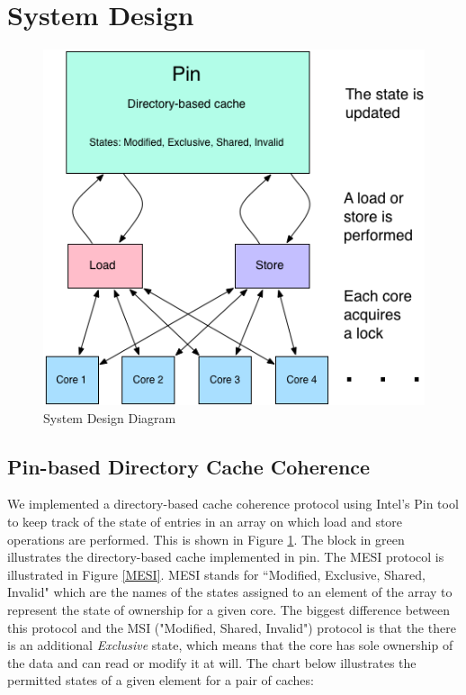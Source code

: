 \documentclass{article}
\begin{document}
\section{System Design}\label{sec:design}
\begin{figure}[H]
\begin{center}
\includegraphics[scale=0.5]{images/comp_arch_sd.png}
\end{center}
\caption{System Design Diagram}
\label{sysD}
\end{figure}

\subsection{Pin-based Directory Cache Coherence}
We implemented a directory-based cache coherence protocol using Intel's Pin tool to keep track of the state of entries in an array on which load and store operations are performed.
This is shown in Figure \ref{sysD}.  
The block in green illustrates the directory-based cache implemented in pin.
The MESI protocol is illustrated in Figure \ref{MESI}.
MESI stands for ``Modified, Exclusive, Shared, Invalid" which are the names of the states assigned to an element of the array to represent the state of ownership for a given core.  
The biggest difference between this protocol and the MSI ("Modified, Shared, Invalid") protocol is that the there is an additional \emph{Exclusive} state, which means that the core has sole ownership of the data and can read or modify it at will.
The chart below illustrates the permitted states of a given element for a pair of caches:\\
\end{document}
